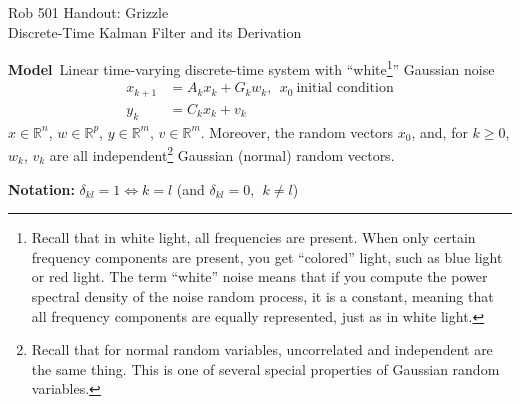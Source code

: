 \documentclass[letterpaper]{article}
\newcommand{\real}{\mathbb R}  %
\begin{document}
\baselineskip=48pt  %


\setlength{\parskip}{.3in}
\setlength{\itemsep}{.3in}

\pagestyle{plain}

{\Large \bf
\begin{center}
Rob 501 Handout: Grizzle \\
Discrete-Time  Kalman Filter and its Derivation
\end{center}
}



\Large

\noindent \textbf{Model}~Linear time-varying discrete-time system with ``white\footnote{Recall that in white light, all frequencies are present. When only certain frequency components are present, you get ``colored'' light, such as blue light or red light. The term ``white'' noise means that if you compute the power spectral density of the noise random process, it is a constant, meaning that all frequency components are equally represented, just as in white light. }'' Gaussian noise
\begin{align*}
x_{k+1} &= A_k x_k + G_k w_k,~~x_0~\text{initial condition}\\
y_k &= C_k x_k + v_k
\end{align*}
$x\in \real^n$, $w \in \real^p$, $y\in \real^m$, $v\in \real^m$. Moreover, the random vectors
$x_0$, and, for $k\ge 0$,  $w_k$, $v_k$ are all independent\footnote{Recall that for normal random variables, uncorrelated and independent are the same thing. This is one of several special properties of Gaussian random variables. } Gaussian (normal) random vectors.

\noindent \textbf{Notation:} $\delta_{kl} = 1 \Leftrightarrow k = l$ (and $\delta_{kl} = 0,~~k \neq l$)
\end{document}
